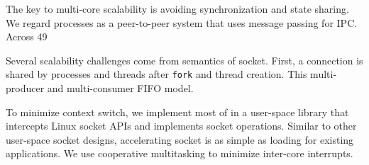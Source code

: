 The key to multi-core scalability is avoiding synchronization and state sharing. We regard processes as a peer-to-peer system that uses message passing for IPC. Across 49 

Several scalability challenges come from semantics of socket. First, a connection is shared by processes and threads after \texttt{fork} and thread creation. This multi-producer and multi-consumer FIFO model. 

To minimize context switch, we implement most of \sys{} in a user-space library \libipc{} that intercepts Linux socket APIs and implements socket operations. Similar to other user-space socket designs, accelerating socket is as simple as loading \libipc{} for existing applications. We use cooperative multitasking to minimize inter-core interrupts.